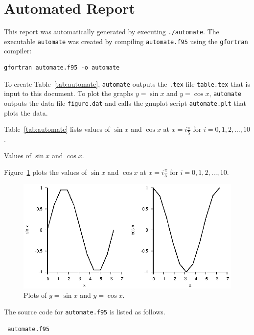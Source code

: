 \documentclass[11pt,a4paper]{article}
\begin{document}
\section*{Automated Report}

This report was automatically generated by executing \verb|./automate|. The executable \verb|automate| was created by compiling \verb|automate.f95| using the \verb|gfortran| compiler:
\begin{Verbatim}[frame=single]
gfortran automate.f95 -o automate
\end{Verbatim}
To create Table~\ref{tab:automate}, \verb|automate| outputs the \verb|.tex| file \verb|table.tex| that is input to this document. To plot the graphs $y=\sin x$ and $y=\cos x$, \verb|automate| outputs the data file \verb|figure.dat| and calls the gnuplot script \verb|automate.plt| that plots the data. 

Table~\ref{tab:automate} lists values of $\sin x$ and $\cos x$ at $\displaystyle x=i\frac{\pi}{5}$ for $i=0,1,2,\ldots,10$.
\begin{table}[h!]
\centering

\caption{Values of $\sin x$ and $\cos x$.}
\label{tab:automate}
\end{table}

Figure~\ref{fig:automate} plots the values of $\sin x$ and $\cos x$ at $\displaystyle x=i\frac{\pi}{5}$ for $i=0,1,2,\ldots,10$.
\begin{figure}[h!]
\centerline{\includegraphics[width=.5\textwidth,keepaspectratio]{figure.eps}}
\caption{Plots of $y=\sin x$ and $y=\cos x$.}
\label{fig:automate}
\end{figure}

The source code for \verb|automate.f95| is listed as follows.

\hrulefill\verb| automate.f95 |\hrulefill\vspace{-2mm}

\end{document}
